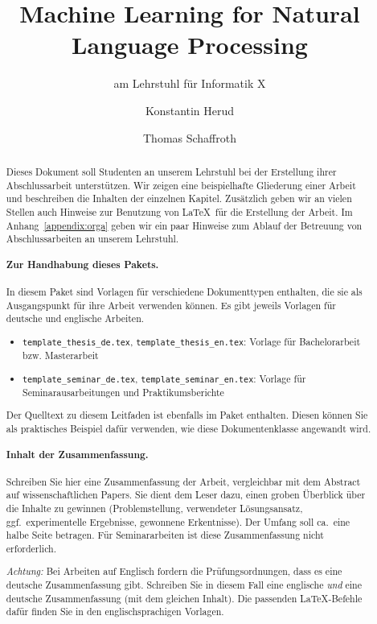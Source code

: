 \documentclass[bachelor,german]{info1thesis}
\title{Machine Learning for Natural Language Processing} %
\subtitle{am Lehrstuhl für Informatik X}
\author{Konstantin Herud\and Thomas Schaffroth} %
\begin{document}

\begin{abstract}
    Dieses Dokument soll Studenten an unserem Lehrstuhl bei der Erstellung
    ihrer Abschlussarbeit unterstützen.
    Wir zeigen eine beispielhafte Gliederung einer Arbeit und beschreiben
    die Inhalten der einzelnen Kapitel.
    Zusätzlich geben wir an vielen Stellen auch Hinweise zur Benutzung von
    \LaTeX\ für die Erstellung der Arbeit.
    Im Anhang~\ref{appendix:orga} geben wir ein paar Hinweise zum Ablauf der
    Betreuung von Abschlussarbeiten an unserem Lehrstuhl.

    \paragraph{Zur Handhabung dieses Pakets.}
    In diesem Paket sind Vorlagen für verschiedene Dokumenttypen enthalten, die
    sie als Ausgangspunkt für ihre Arbeit verwenden können.
    Es gibt jeweils Vorlagen für deutsche und englische Arbeiten.
    \begin{itemize}
        \item \verb+template_thesis_de.tex+, \verb+template_thesis_en.tex+:
            Vorlage für Bachelorarbeit bzw. Masterarbeit
        \item \verb+template_seminar_de.tex+, \verb+template_seminar_en.tex+:
            Vorlage für Seminarausarbeitungen und Praktikumsberichte
    \end{itemize}
    Der Quelltext zu diesem Leitfaden ist ebenfalls im Paket enthalten.
    Diesen können Sie als praktisches Beispiel dafür verwenden, wie diese
    Dokumentenklasse angewandt wird.

    \paragraph{Inhalt der Zusammenfassung.}
    Schreiben Sie hier eine Zusammenfassung der Arbeit, vergleichbar mit dem Abstract auf wissenschaftlichen Papers.
    Sie dient dem Leser dazu, einen groben Überblick über die Inhalte zu gewinnen (Problemstellung, verwendeter Lösungsansatz, ggf.\ experimentelle Ergebnisse, gewonnene Erkentnisse).
    Der Umfang soll ca.\ eine halbe Seite betragen.
    Für Seminararbeiten ist diese Zusammenfassung nicht erforderlich.
    
    \emph{Achtung:} Bei Arbeiten auf Englisch fordern die
    Prüfungsordnungen, dass es eine deutsche Zusammenfassung gibt.
    Schreiben Sie in diesem Fall eine englische \emph{und} eine deutsche Zusammenfassung (mit dem gleichen Inhalt).
    Die passenden \LaTeX-Befehle dafür finden Sie in den englischsprachigen
    Vorlagen.


\end{abstract}
\end{document}
